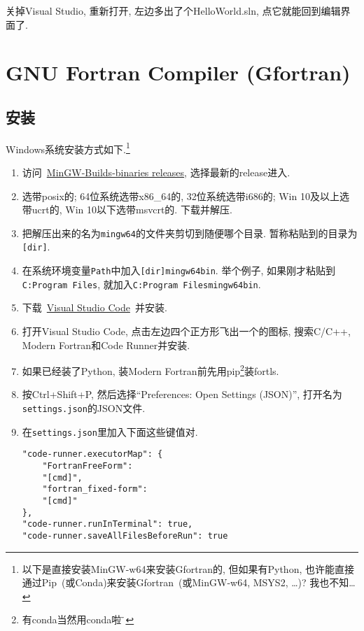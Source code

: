 关掉Visual Studio, 重新打开, 左边多出了个HelloWorld.sln, 点它就能回到编辑界面了.

\section[GNU Fortran Compiler]{GNU Fortran Compiler (Gfortran)}

\subsection{安装}

Windows系统安装方式如下.\footnote{
    以下是直接安装MinGW-w64来安装Gfortran的, 但如果有Python, 也许能直接通过Pip~(或Conda)来安装Gfortran~(或MinGW-w64, MSYS2, \dots)? 我也不知\dots
}
\begin{enumerate}
    \item 访问~\href{https://github.com/niXman/mingw-builds-binaries/releases}
    {MinGW-Builds-binaries releases}, 选择最新的release进入.
    \item 选带posix的; 64位系统选带x86\_64的, 32位系统选带i686的; Win 10及以上选带ucrt的, Win 10以下选带msvcrt的. 下载并解压.
    \item 把解压出来的名为\texttt{mingw64}的文件夹剪切到随便哪个目录. 暂称粘贴到的目录为\texttt{[dir]}.
    \item 在系统环境变量\texttt{Path}中加入\texttt{[dir]\bs{}mingw64\bs{}bin}. 举个例子, 如果刚才粘贴到\texttt{C:\bs{}Program Files}, 就加入\texttt{C:\bs{}Program Files\bs{}mingw64\bs{}bin}.
    \item 下载~\href{https://code.visualstudio.com/sha/download?build=stable&os=win32-x64-user}
    {Visual Studio Code}~并安装.
    \item 打开Visual Studio Code, 点击左边四个正方形飞出一个的图标, 搜索C/C++, Modern Fortran和Code Runner并安装.
    \item[] 如果已经装了Python, 装Modern Fortran前先用pip\footnote{有conda当然用conda啦$\!\text{\~{}}$}装fortls.
    \item 按Ctrl+Shift+P, 然后选择``Preferences: Open Settings (JSON)'', 打开名为\texttt{settings.json}的JSON文件.
    \item 在\texttt{settings.json}里加入下面这些键值对.
    \begin{lstlisting}
"code-runner.executorMap": {
    "FortranFreeForm":
    "[cmd]",
    "fortran_fixed-form":
    "[cmd]"
},
"code-runner.runInTerminal": true,
"code-runner.saveAllFilesBeforeRun": true
    \end{lstlisting}
\end{enumerate}


